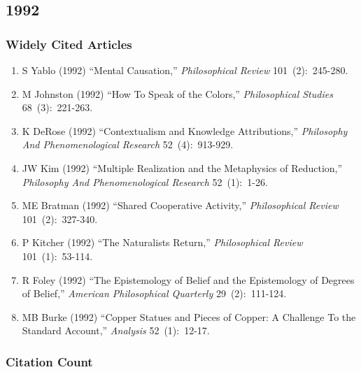 \documentclass[
  10pt,
  letterpaper,
  DIV=11,
  numbers=noendperiod,
  twoside]{scrartcl}
\providecommand{\tightlist}{%
  \setlength{\itemsep}{0pt}\setlength{\parskip}{0pt}}\usepackage{longtable,booktabs,array}
\begin{document}
\newpage

\subsection{1992}\label{sec-s1992}

\subsubsection*{Widely Cited Articles}\label{widely-cited-articles-35}

\begin{enumerate}
\def\labelenumi{\arabic{enumi}.}
\tightlist
\item
  S Yablo (1992) ``Mental Causation,'' \emph{Philosophical Review}
  101~(2):~245-280.
\item
  M Johnston (1992) ``How To Speak of the Colors,'' \emph{Philosophical
  Studies} 68~(3):~221-263.
\item
  K DeRose (1992) ``Contextualism and Knowledge Attributions,''
  \emph{Philosophy And Phenomenological Research} 52~(4):~913-929.
\item
  JW Kim (1992) ``Multiple Realization and the Metaphysics of
  Reduction,'' \emph{Philosophy And Phenomenological Research}
  52~(1):~1-26.
\item
  ME Bratman (1992) ``Shared Cooperative Activity,'' \emph{Philosophical
  Review} 101~(2):~327-340.
\item
  P Kitcher (1992) ``The Naturalists Return,'' \emph{Philosophical
  Review} 101~(1):~53-114.
\item
  R Foley (1992) ``The Epistemology of Belief and the Epistemology of
  Degrees of Belief,'' \emph{American Philosophical Quarterly}
  29~(2):~111-124.
\item
  MB Burke (1992) ``Copper Statues and Pieces of Copper: A Challenge To
  the Standard Account,'' \emph{Analysis} 52~(1):~12-17.
\end{enumerate}

\subsubsection*{Citation Count}\label{sec-count-1992}
\end{document}
